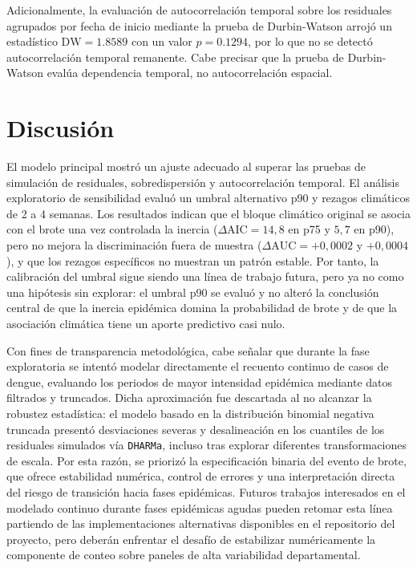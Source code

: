 \documentclass[11pt,a4paper]{article}
\begin{document}
\medskip

Adicionalmente, la evaluación de autocorrelación temporal sobre los residuales agrupados por fecha de inicio mediante la prueba de Durbin-Watson arrojó un estadístico $\text{DW} = 1.8589$ con un valor $p = 0.1294$, por lo que no se detectó autocorrelación temporal remanente. Cabe precisar que la prueba de Durbin-Watson evalúa dependencia temporal, no autocorrelación espacial.

\section{Discusión}

El modelo principal mostró un ajuste adecuado al superar las pruebas de simulación de residuales, sobredispersión y autocorrelación temporal. El análisis exploratorio de sensibilidad evaluó un umbral alternativo p90 y rezagos climáticos de 2 a 4 semanas. Los resultados indican que el bloque climático original se asocia con el brote una vez controlada la inercia ($\Delta\text{AIC} = 14{,}8$ en p75 y $5{,}7$ en p90), pero no mejora la discriminación fuera de muestra ($\Delta\text{AUC} = +0{,}0002$ y $+0{,}0004$), y que los rezagos específicos no muestran un patrón estable. Por tanto, la calibración del umbral sigue siendo una línea de trabajo futura, pero ya no como una hipótesis sin explorar: el umbral p90 se evaluó y no alteró la conclusión central de que la inercia epidémica domina la probabilidad de brote y de que la asociación climática tiene un aporte predictivo casi nulo.

\medskip

Con fines de transparencia metodológica, cabe señalar que durante la fase exploratoria se intentó modelar directamente el recuento continuo de casos de dengue, evaluando los periodos de mayor intensidad epidémica mediante datos filtrados y truncados. Dicha aproximación fue descartada al no alcanzar la robustez estadística: el modelo basado en la distribución binomial negativa truncada presentó desviaciones severas y desalineación en los cuantiles de los residuales simulados vía \texttt{DHARMa}, incluso tras explorar diferentes transformaciones de escala. Por esta razón, se priorizó la especificación binaria del evento de brote, que ofrece estabilidad numérica, control de errores y una interpretación directa del riesgo de transición hacia fases epidémicas. Futuros trabajos interesados en el modelado continuo durante fases epidémicas agudas pueden retomar esta línea partiendo de las implementaciones alternativas disponibles en el repositorio del proyecto, pero deberán enfrentar el desafío de estabilizar numéricamente la componente de conteo sobre paneles de alta variabilidad departamental.
\end{document}

